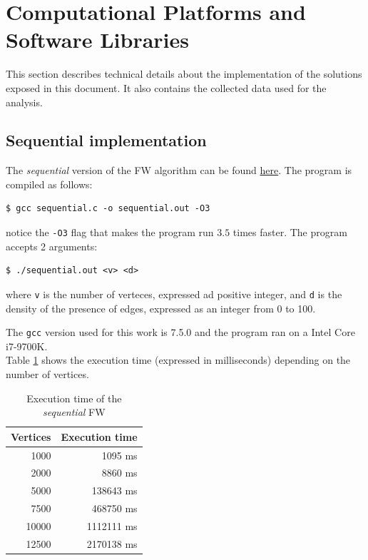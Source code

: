 \section{Computational Platforms and Software Libraries}
This section describes technical details about the implementation of the solutions exposed in this document. It also contains
the collected data used for the analysis.
\subsection{Sequential implementation}
The \emph{sequential} version of the FW algorithm can be found \href{https://github.com/firaja/Parallel-FloydWarshall/blob/master/sequential.c}{here}. 
The program is compiled as follows:
\begin{lstlisting}[basicstyle=\footnotesize\ttfamily]
$ gcc sequential.c -o sequential.out -O3
\end{lstlisting}

notice the \texttt{-O3} flag that makes the program run $3.5$ times faster.
The program accepts 2 arguments:
\begin{lstlisting}[basicstyle=\footnotesize\ttfamily]
$ ./sequential.out <v> <d>
\end{lstlisting}
where \texttt{v} is the number of verteces, expressed ad positive integer, and \texttt{d} is the density of the presence of edges, expressed as an integer from 0 to 100.
\par
The \texttt{gcc} version used for this work is 7.5.0 and the program ran on a Intel Core i7-9700K. \\
Table \ref*{tab:seq-time} shows the execution time (expressed in milliseconds) depending on the number of vertices.


\begin{table}[h!]
\centering
\begin{tabular}{|r|r|}
\hline
\rowcolor[HTML]{3166FF} 
{\color[HTML]{FFFFFF} \textbf{Vertices}} & {\color[HTML]{FFFFFF} \textbf{Execution time}} \\ \hline
1000                                     & 1095 ms                                        \\ \hline
2000                                     & 8860 ms                                        \\ \hline
5000                                     & 138643 ms                                      \\ \hline
7500                                     & 468750 ms                                      \\ \hline
10000                                    & 1112111 ms                                     \\ \hline
12500                                    & 2170138 ms                                     \\ \hline
\end{tabular}
\caption{Execution time of the \emph{sequential} FW}                                                                                                                                            
\label{tab:seq-time} 
\end{table}


